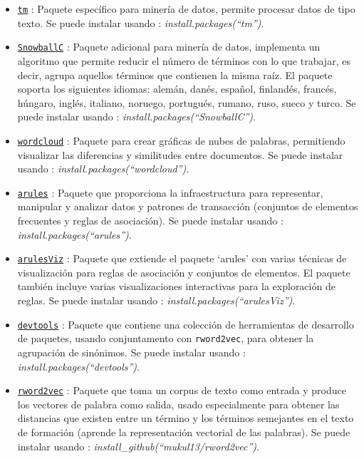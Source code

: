 \documentclass[spanish,]{article}
\begin{document}
\begin{itemize}
\item
  \href{https://cran.r-project.org/web/packages/tm/tm.pdf}{\texttt{tm}}
  : Paquete específico para minería de datos, permite procesar datos de
  tipo texto. Se puede instalar usando :
  \emph{install.packages(``tm'')}.
\item
  \href{https://cran.r-project.org/web/packages/SnowballC/SnowballC.pdf}{\texttt{SnowballC}}
  : Paquete adicional para minería de datos, implementa un algoritmo que
  permite reducir el número de términos con lo que trabajar, es decir,
  agrupa aquellos términos que contienen la misma raíz. El paquete
  soporta los siguientes idiomas: alemán, danés, español, finlandés,
  francés, húngaro, inglés, italiano, noruego, portugués, rumano, ruso,
  sueco y turco. Se puede instalar usando :
  \emph{install.packages(``SnowballC'')}.
\item
  \href{https://cran.r-project.org/web/packages/wordcloud/wordcloud.pdf}{\texttt{wordcloud}}
  : Paquete para crear gráficas de nubes de palabras, permitiendo
  visualizar las diferencias y similitudes entre documentos. Se puede
  instalar usando : \emph{install.packages(``wordcloud'')}.
\item
  \href{https://cran.r-project.org/web/packages/arules/arules.pdf}{\texttt{arules}}
  : Paquete que proporciona la infraestructura para representar,
  manipular y analizar datos y patrones de transacción (conjuntos de
  elementos frecuentes y reglas de asociación). Se puede instalar usando
  : \emph{install.packages(``arules'')}.
\item
  \href{https://cran.r-project.org/web/packages/arulesViz/arulesViz.pdf}{\texttt{arulesViz}}
  : Paquete que extiende el paquete `arules' con varias técnicas de
  visualización para reglas de asociación y conjuntos de elementos. El
  paquete también incluye varias visualizaciones interactivas para la
  exploración de reglas. Se puede instalar usando :
  \emph{install.packages(``arulesViz'')}.
\item
  \href{https://cran.r-project.org/web/packages/devtools/devtools.pdf}{\texttt{devtools}}
  : Paquete que contiene una colección de herramientas de desarrollo de
  paquetes, usando conjuntamento con \texttt{rword2vec}, para obtener la
  agrupación de sinónimos. Se puede instalar usando :
  \emph{install.packages(``devtools'')}.
\item
  \href{https://github.com/mukul13/rword2vec}{\texttt{rword2vec}} :
  Paquete que toma un corpus de texto como entrada y produce los
  vectores de palabra como salida, usado especialmente para obtener las
  distancias que existen entre un término y los términos semejantes en
  el texto de formación (aprende la representación vectorial de las
  palabras). Se puede instalar usando :
  \emph{install\_github(``mukul13/rword2vec'')}.
\end{itemize}
\end{document}
